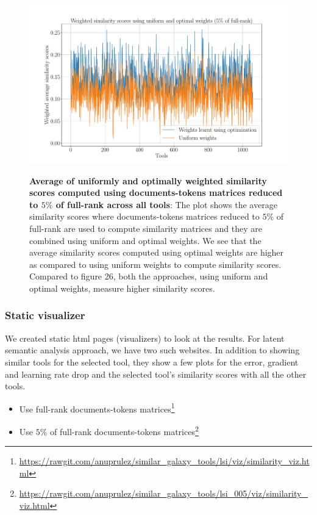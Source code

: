 \begin{figure}[h]
\begin{centering}
    {\includegraphics[scale=0.37]{figures/Optimization_005_lsi.pdf}}
    \caption[Average of uniformly and optimally weighted similarity scores computed using documents-tokens matrices reduced to $5\%$ of full-rank across all tools]{\textbf{Average of uniformly and optimally weighted similarity scores computed using documents-tokens matrices reduced to $5\%$ of full-rank across all tools}: The plot shows the average similarity scores where documents-tokens matrices reduced to $5\%$ of full-rank are used to compute similarity matrices and they are combined using uniform and optimal weights. We see that the average similarity scores computed using optimal weights are higher as compared to using uniform weights to compute similarity scores. Compared to figure 26, both the approaches, using uniform and optimal weights, measure higher similarity scores. }
\end{centering}
\end{figure}

\subsubsection{Static visualizer}
We created static html pages (visualizers) to look at the results. For latent semantic analysis approach, we have two such websites. In addition to showing similar tools for the selected tool, they show a few plots for the error, gradient and learning rate drop and the selected tool's similarity scores with all the other tools.

\begin{itemize}
\item Use full-rank documents-tokens matrices\footnote{\url{https://rawgit.com/anuprulez/similar_galaxy_tools/lsi/viz/similarity_viz.html}}
\item Use $5\%$ of full-rank documents-tokens matrices\footnote{\url{https://rawgit.com/anuprulez/similar_galaxy_tools/lsi_005/viz/similarity_viz.html}}
\end{itemize}

